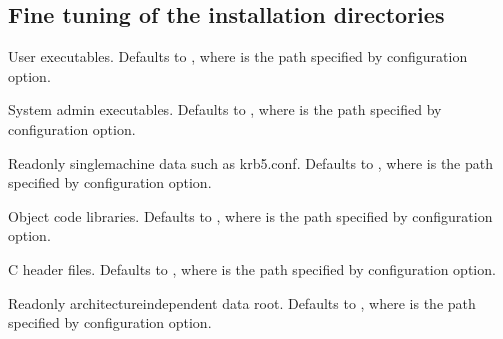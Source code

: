 \documentclass[letterpaper,10pt,english]{sphinxmanual}
\begin{document}
\subsection{Fine tuning of the installation directories}
\label{\detokenize{build/options2configure:fine-tuning-of-the-installation-directories}}\begin{description}
\sphinxAtStartPar
User executables.  Defaults to , where
 is the path specified by \sphinxstylestrong{\sphinxhyphen{}}
configuration option.

\sphinxAtStartPar
System admin executables.  Defaults to , where
 is the path specified by \sphinxstylestrong{\sphinxhyphen{}}
configuration option.

\sphinxAtStartPar
Read\sphinxhyphen{}only single\sphinxhyphen{}machine data such as krb5.conf.
Defaults to , where
 is the path specified by \sphinxstylestrong{\sphinxhyphen{}} configuration
option.

\sphinxAtStartPar
Object code libraries.  Defaults to , where
 is the path specified by \sphinxstylestrong{\sphinxhyphen{}}
configuration option.

\sphinxAtStartPar
C header files.  Defaults to , where  is
the path specified by \sphinxstylestrong{\sphinxhyphen{}} configuration option.

\sphinxAtStartPar
Read\sphinxhyphen{}only architecture\sphinxhyphen{}independent data root.  Defaults to
, where  is the path specified by
\sphinxstylestrong{\sphinxhyphen{}} configuration option.


\end{description}
\end{document}

